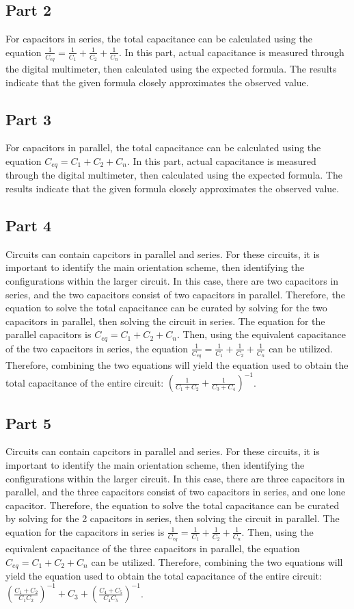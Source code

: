\documentclass[titlepage]{article}
\begin{document}
   	\subsection{Part 2} 
	For capacitors in series, the total capacitance can be calculated using the equation $\frac{1}{C_{eq}} = \frac{1}{C_1} + \frac{1}{C_2} + \frac{1}{C_n}$. In this part, actual capacitance is measured through the digital multimeter, then calculated using the expected formula. The results indicate that the given formula closely approximates the observed value. 
   	\subsection{Part 3} 
	For capacitors in parallel, the total capacitance can be calculated using the equation ${C_{eq}} = C_1 + C_2 + C_n$. In this part, actual capacitance is measured through the digital multimeter, then calculated using the expected formula. The results indicate that the given formula closely approximates the observed value. 

   	\subsection{Part 4} 
	Circuits can contain capcitors in parallel and series. For these circuits, it is important to identify the main orientation scheme, then identifying the configurations within the larger circuit. In this case, there are two capacitors in series, and the two capacitors consist of two capacitors in parallel. Therefore, the equation to solve the total capacitance can be curated by solving for the two capacitors in parallel, then solving the circuit in series. The equation for the parallel capacitors is  ${C_{eq}} = C_1 + C_2 + C_n$. Then, using the equivalent capacitance of the two capacitors in series, the equation $\frac{1}{C_{eq}} = \frac{1}{C_1} + \frac{1}{C_2} + \frac{1}{C_n}$ can be utilized. Therefore, combining the two equations will yield the equation used to obtain the total capacitance of the entire circuit: $\left(\frac{1}{C_1 + C_2} + \frac{1}{C_3 + C_4}\right)^{-1}$.
	\subsection{Part 5} 
	Circuits can contain capcitors in parallel and series. For these circuits, it is important to identify the main orientation scheme, then identifying the configurations within the larger circuit. In this case, there are three capacitors in parallel, and the three capacitors consist of two capacitors in series, and one lone capacitor. Therefore, the equation to solve the total capacitance can be curated by solving for the 2 capacitors in series, then solving the circuit in parallel. The equation for the capacitors in series  is  $\frac{1}{C_{eq}} = \frac{1}{C_1} + \frac{1}{C_2} + \frac{1}{C_n}$. Then, using the equivalent capacitance of the three capacitors in parallel, the equation ${C_{eq}} = C_1 + C_2 + C_n$ can be utilized. Therefore, combining the two equations will yield the equation used to obtain the total capacitance of the entire circuit: $\left(\frac{C_1+C_2}{C_1 C_2}\right)^{-1}+ C_3 +\left(\frac{C_4+C_5}{C_4 C_5}\right)^{-1}$.
\end{document}
